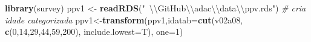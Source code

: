 \documentclass[]{book}
\newenvironment{Shaded}{\begin{snugshade}}{\end{snugshade}}
\newcommand{\KeywordTok}[1]{\textcolor[rgb]{0.13,0.29,0.53}{\textbf{#1}}}
\newcommand{\DataTypeTok}[1]{\textcolor[rgb]{0.13,0.29,0.53}{#1}}
\newcommand{\DecValTok}[1]{\textcolor[rgb]{0.00,0.00,0.81}{#1}}
\newcommand{\CharTok}[1]{\textcolor[rgb]{0.31,0.60,0.02}{#1}}
\newcommand{\StringTok}[1]{\textcolor[rgb]{0.31,0.60,0.02}{#1}}
\newcommand{\CommentTok}[1]{\textcolor[rgb]{0.56,0.35,0.01}{\textit{#1}}}
\newcommand{\NormalTok}[1]{#1}
\theoremstyle{definition}
\theoremstyle{definition}
\theoremstyle{definition}
\theoremstyle{remark}
\begin{document}
\begin{Shaded}
\begin{Highlighting}[]
\KeywordTok{library}\NormalTok{(survey)}
\NormalTok{ppv1 <-}\StringTok{ }\KeywordTok{readRDS}\NormalTok{(}\StringTok{"~}\CharTok{\textbackslash{}\textbackslash{}}\StringTok{GitHub}\CharTok{\textbackslash{}\textbackslash{}}\StringTok{adac}\CharTok{\textbackslash{}\textbackslash{}}\StringTok{data}\CharTok{\textbackslash{}\textbackslash{}}\StringTok{ppv.rds"}\NormalTok{)}
\CommentTok{# cria idade categorizada}
\NormalTok{ppv1<-}\KeywordTok{transform}\NormalTok{(ppv1,}\DataTypeTok{idatab=}\KeywordTok{cut}\NormalTok{(v02a08,}
\KeywordTok{c}\NormalTok{(}\DecValTok{0}\NormalTok{,}\DecValTok{14}\NormalTok{,}\DecValTok{29}\NormalTok{,}\DecValTok{44}\NormalTok{,}\DecValTok{59}\NormalTok{,}\DecValTok{200}\NormalTok{), }\DataTypeTok{include.lowest=}\NormalTok{T), }\DataTypeTok{one=}\DecValTok{1}\NormalTok{)}


\end{Highlighting}
\end{Shaded}
\end{document}
